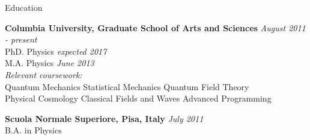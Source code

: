 \documentclass{resume} %
\begin{document}

\begin{rSection}{Education}

{\bf Columbia University, Graduate School of Arts and Sciences} \hfill {\em August 2011 - present} \\ 
PhD. Physics \hfill {\em expected 2017} \\ M.A. Physics \hfill {\em June 2013} 
\\
\textit{Relevant coursework:} \\
Quantum Mechanics \hspace{4pt} Statistical Mechanics \hspace{4pt} Quantum Field Theory\\
Physical Cosmology \hspace{4pt} Classical Fields and Waves \hspace{4pt} Advanced Programming

{\bf Scuola Normale Superiore, Pisa, Italy} \hfill {\em July 2011} \\ 
B.A. in Physics \\

\end{rSection}

\end{document}
